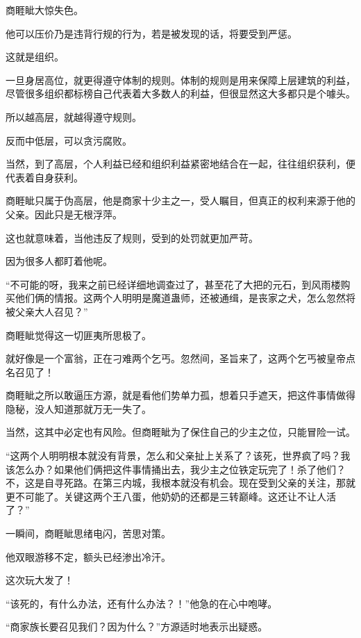 
\begin{this_body}



商睚眦大惊失色。

他可以压价乃是违背行规的行为，若是被发现的话，将要受到严惩。

这就是组织。

一旦身居高位，就更得遵守体制的规则。体制的规则是用来保障上层建筑的利益，尽管很多组织都标榜自己代表着大多数人的利益，但很显然这大多都只是个噱头。

所以越高层，就越得遵守规则。

反而中低层，可以贪污腐败。

当然，到了高层，个人利益已经和组织利益紧密地结合在一起，往往组织获利，便代表着自身获利。

商睚眦只属于伪高层，他是商家十少主之一，受人瞩目，但真正的权利来源于他的父亲。因此只是无根浮萍。

这也就意味着，当他违反了规则，受到的处罚就更加严苛。

因为很多人都盯着他呢。

“不可能的呀，我来之前已经详细地调查过了，甚至花了大把的元石，到风雨楼购买他们俩的情报。这两个人明明是魔道蛊师，还被通缉，是丧家之犬，怎么忽然将被父亲大人召见？”

商睚眦觉得这一切匪夷所思极了。

就好像是一个富翁，正在刁难两个乞丐。忽然间，圣旨来了，这两个乞丐被皇帝点名召见了！

商睚眦之所以敢逼压方源，就是看他们势单力孤，想着只手遮天，把这件事情做得隐秘，没人知道那就万无一失了。

当然，这其中必定也有风险。但商睚眦为了保住自己的少主之位，只能冒险一试。

“这两个人明明根本就没有背景，怎么和父亲扯上关系了？该死，世界疯了吗？我该怎么办？如果他们俩把这件事情捅出去，我少主之位铁定玩完了！杀了他们？不，这是自寻死路。在第三内城，我根本就没有机会。现在受到父亲的关注，那就更不可能了。关键这两个王八蛋，他奶奶的还都是三转巅峰。这还让不让人活了？”

一瞬间，商睚眦思绪电闪，苦思对策。

他双眼游移不定，额头已经渗出冷汗。

这次玩大发了！

“该死的，有什么办法，还有什么办法？！”他急的在心中咆哮。

“商家族长要召见我们？因为什么？”方源适时地表示出疑惑。


\end{this_body}

